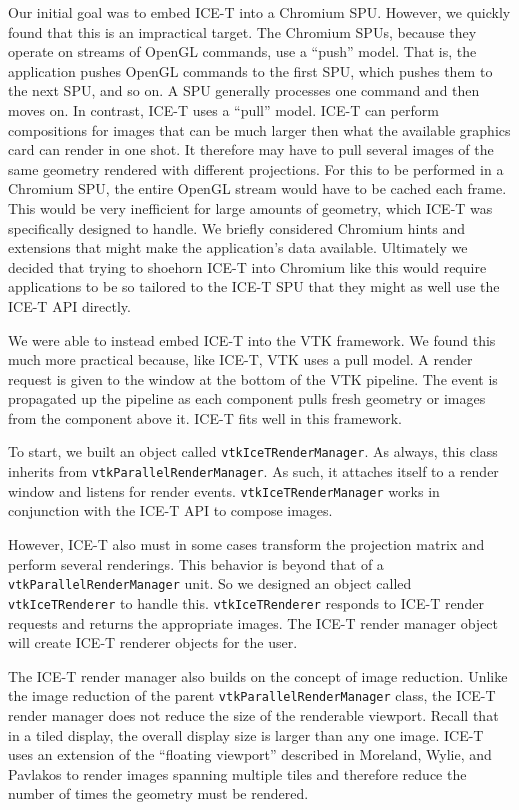 \documentclass[twocolumn]{article}
\newcommand{\cidentifier}[1]{\texttt{#1}}
\begin{document}
  Our initial goal was to embed ICE-T into a Chromium SPU.  However, we
  quickly found that this is an impractical target.  The Chromium SPUs,
  because they operate on streams of OpenGL commands, use a ``push'' model.
  That is, the application pushes OpenGL commands to the first SPU, which
  pushes them to the next SPU, and so on.  A SPU generally processes one
  command and then moves on.  In contrast, ICE-T uses a ``pull'' model.
  ICE-T can perform compositions for images that can be much larger then
  what the available graphics card can render in one shot.  It therefore
  may have to pull several images of the same geometry rendered with
  different projections.  For this to be performed in a Chromium SPU, the
  entire OpenGL stream would have to be cached each frame.  This would be
  very inefficient for large amounts of geometry, which ICE-T was
  specifically designed to handle.  We briefly considered Chromium hints
  and extensions that might make the application's data available.
  Ultimately we decided that trying to shoehorn ICE-T into Chromium like
  this would require applications to be so tailored to the ICE-T SPU that
  they might as well use the ICE-T API directly.

  We were able to instead embed ICE-T into the VTK framework.  We found
  this much more practical because, like ICE-T, VTK uses a pull model.  A
  render request is given to the window at the bottom of the VTK pipeline.
  The event is propagated up the pipeline as each component pulls fresh
  geometry or images from the component above it.  ICE-T fits well in this
  framework.

  To start, we built an object called
  \cidentifier{vtk\-Ice\-T\-Render\-Manager}.  As always, this class
  inherits from \cidentifier{vtk\-Parallel\-Render\-Manager}.  As such, it
  attaches itself to a render window and listens for render events.
  \cidentifier{vtk\-Ice\-T\-Render\-Manager} works in conjunction with the
  ICE-T API to compose images.

  However, ICE-T also must in some cases transform the projection matrix
  and perform several renderings.  This behavior is beyond that of a
  \cidentifier{vtk\-Parallel\-Render\-Manager} unit.  So we designed an
  object called \cidentifier{vtk\-Ice\-T\-Renderer} to handle this.
  \cidentifier{vtk\-Ice\-T\-Renderer} responds to ICE-T render requests and
  returns the appropriate images.  The ICE-T render manager object will
  create ICE-T renderer objects for the user.

  The ICE-T render manager also builds on the concept of image reduction.
  Unlike the image reduction of the parent
  \cidentifier{vtk\-Parallel\-Render\-Manager} class, the ICE-T render
  manager does not reduce the size of the renderable viewport.  Recall that
  in a tiled display, the overall display size is larger than any one
  image.  ICE-T uses an extension of the ``floating viewport'' described in
  Moreland, Wylie, and Pavlakos \cite{Moreland01} to render images spanning
  multiple tiles and therefore reduce the number of times the geometry must
  be rendered.
\end{document}
